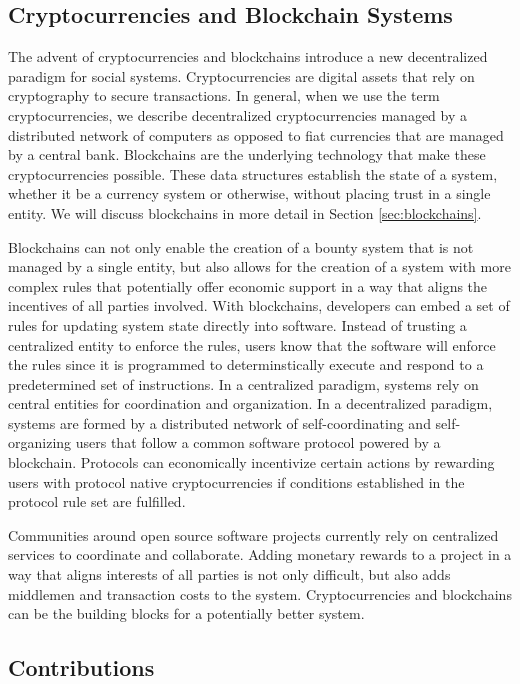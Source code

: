 \subsection{Cryptocurrencies and Blockchain Systems}

The advent of cryptocurrencies and blockchains introduce a new decentralized
paradigm for social systems. Cryptocurrencies are digital assets that rely on
cryptography to secure transactions. In general, when we use the term
cryptocurrencies, we describe decentralized
cryptocurrencies managed by a distributed network of computers as opposed to
fiat currencies that are managed by a central bank. Blockchains are the
underlying technology that make these cryptocurrencies possible. These data
structures establish the state of a system, whether it be a currency system or
otherwise, without placing trust in a single entity. We will discuss blockchains
in more detail in Section \ref{sec:blockchains}.

Blockchains can not only enable the creation of a bounty system that is not
managed by a single entity, but also allows for the creation of a system with
more complex rules that potentially offer economic support in a way that aligns the
incentives of all parties involved. With blockchains, developers can embed a set
of rules for updating system state directly into software. Instead of trusting a
centralized entity to enforce the rules, users know that the software will
enforce the rules since it is programmed to determinstically execute and respond
to a predetermined set of instructions. In a centralized paradigm, systems rely
on central entities for coordination and organization. In a decentralized
paradigm, systems are formed by a distributed network of self-coordinating and
self-organizing users that follow a common software protocol powered by a
blockchain. Protocols can economically incentivize certain actions by rewarding
users with protocol native cryptocurrencies if conditions established in the
protocol rule set are fulfilled.

Communities around open source software projects currently rely on centralized
services to coordinate and collaborate. Adding monetary rewards to a project in
a way that aligns interests of all parties is not only difficult, but also adds
middlemen and transaction costs to the system. Cryptocurrencies and
blockchains can be the building blocks for a potentially better system.

\subsection{Contributions}

